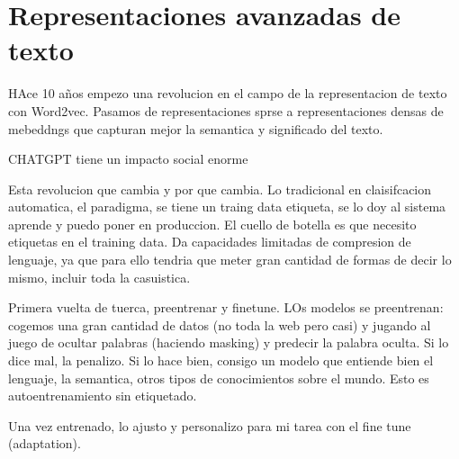 \chapter{Representaciones avanzadas de texto}\label{Chapter5} 

HAce 10 años empezo una revolucion en el campo de la representacion de texto con Word2vec. Pasamos de representaciones sprse a representaciones densas de mebeddngs que capturan mejor la semantica y significado del texto. 

CHATGPT tiene un impacto social enorme


Esta revolucion que cambia y por que cambia. Lo tradicional en claisifcacion automatica, el paradigma, se tiene un traing data etiqueta, se lo doy al sistema aprende y puedo poner en produccion. El cuello de botella es que necesito etiquetas en el training data. Da capacidades limitadas de compresion de lenguaje, ya que para ello tendria que meter gran cantidad de formas de decir lo mismo, incluir toda la casuistica.

Primera vuelta de tuerca, preentrenar y finetune. LOs modelos se preentrenan: cogemos una gran cantidad de datos (no toda la web pero casi) y jugando al juego de ocultar palabras (haciendo masking) y predecir la palabra oculta. Si lo dice mal, la penalizo. Si lo hace bien, consigo un modelo que entiende bien el lenguaje, la semantica, otros tipos de conocimientos sobre el mundo. Esto es autoentrenamiento sin etiquetado.  


Una vez entrenado, lo ajusto y personalizo para mi tarea con el fine tune (adaptation). 